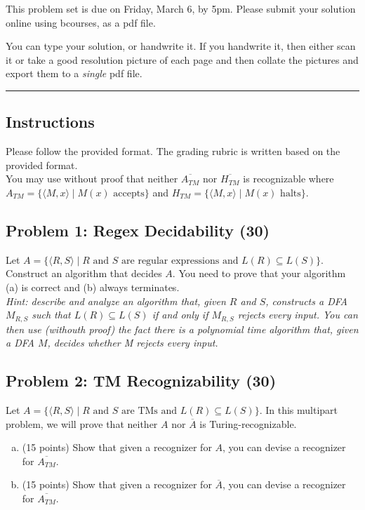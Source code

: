 \documentclass{article}
\begin{document}


This problem set is due on Friday, March 6, by 5pm. Please submit your solution online using bcourses,
as a pdf file. 

You can type your solution, or handwrite it. If you handwrite it, then either
scan it or take a good resolution picture of each page and then collate the pictures
and export them to a {\em single} pdf file.

\bigskip

\hrule



\subsection*{Instructions}

\noindent Please follow the provided format.
The grading rubric is written based on the provided format.\\

\noindent You may use without proof that neither $\overline{A_{TM}}$ nor $\overline{H_{TM}}$ is recognizable where
  $A_{TM} = \{ \langle M, x \rangle \mid M(x) \text{ accepts} \}$ and
  $H_{TM} = \{ \langle M, x \rangle \mid M(x) \text{ halts} \}$.






\subsection*{Problem 1: Regex Decidability (30)}
Let $A =  \{ \langle R, S\rangle \mid R \text{ and } S \text{ are regular expressions and } L(R) \subseteq L(S) \}$.
Construct an algorithm that decides $A$. You need to prove that your algorithm (a) is correct and (b) always terminates.\\

\noindent \emph{Hint: describe and analyze an algorithm that, given $R$ and $S$,
    constructs a DFA $M_{R,S}$ such that $L(R) \subseteq L(S)$ if and only if
    $M_{R,S}$ rejects every input. You can then use (withouth proof) the
    fact there is a polynomial time algorithm that, given a DFA $M$, decides
    whether M rejects every input.
}


\subsection*{Problem 2: TM Recognizability (30)}
Let $A = \{ \langle R, S\rangle \mid R \text{ and } S \text { are TMs and } L(R) \subseteq L(S) \}$.
In this multipart problem, we will prove that neither $A$ nor $\overline{A}$ is Turing-recognizable.
\begin{enumerate}[(a)]
  \item (15 points) Show that given a recognizer for $A$, you can devise a recognizer for $\overline{A_{TM}}$.
  \item (15 points) Show that given a recognizer for $\overline{A}$, you can devise a recognizer for $\overline{A_{TM}}$.
\end{enumerate}
\end{document}
